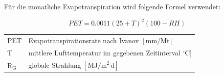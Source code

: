 Für die monatliche Evapotranspiration wird folgende Formel verwendet:

\begin{equation}
\label{eq:ivanov_m}
PET=0.0011(25+T)^2(100-RH)
\end{equation}
\begin{table}[H]
\centering
\begin{tabular}{ll}
PET & Evapotranspirationsrate nach Ivanov  $\mathrm{[mm/Mt]}$\\
T & mittlere Lufttemperatur im gegebenen Zeitinterval $\mathrm{{^\circ}C]}$\\
$\mathrm{R_G}$ & globale Strahlung $\mathrm{[MJ/m^2\,d]}$\\
\end{tabular}
\end{table}






